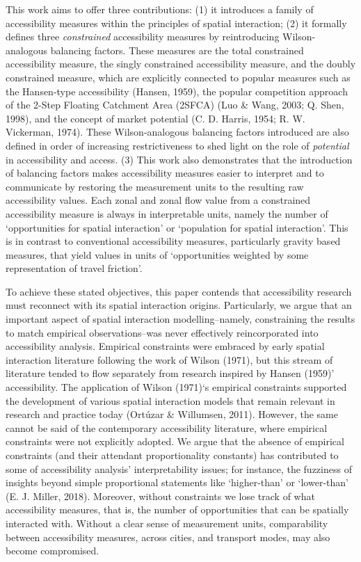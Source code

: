 \documentclass[
11pt, %
oneside, %
english, %
singlespacing, %
]{macthesis} %
\begin{document}
This work aims to offer three contributions: (1) it introduces a family of accessibility measures within the principles of spatial interaction; (2) it formally defines three \emph{constrained} accessibility measures by reintroducing Wilson-analogous balancing factors. These measures are the total constrained accessibility measure, the singly constrained accessibility measure, and the doubly constrained measure, which are explicitly connected to popular measures such as the Hansen-type accessibility (Hansen, 1959), the popular competition approach of the 2-Step Floating Catchment Area (2SFCA) (Luo \& Wang, 2003; Q. Shen, 1998), and the concept of market potential (C. D. Harris, 1954; R. W. Vickerman, 1974). These Wilson-analogous balancing factors introduced are also defined in order of increasing restrictiveness to shed light on the role of \emph{potential} in accessibility and access. (3) This work also demonstrates that the introduction of balancing factors makes accessibility measures easier to interpret and to communicate by restoring the measurement units to the resulting raw accessibility values. Each zonal and zonal flow value from a constrained accessibility measure is always in interpretable units, namely the number of `opportunities for spatial interaction' or `population for spatial interaction'. This is in contrast to conventional accessibility measures, particularly gravity based measures, that yield values in units of `opportunities weighted by some representation of travel friction'.

To achieve these stated objectives, this paper contends that accessibility research must reconnect with its spatial interaction origins. Particularly, we argue that an important aspect of spatial interaction modelling--namely, constraining the results to match empirical observations--was never effectively reincorporated into accessibility analysis. Empirical constraints were embraced by early spatial interaction literature following the work of Wilson (1971), but this stream of literature tended to flow separately from research inspired by Hansen (1959)' accessibility. The application of Wilson (1971)`s empirical constraints supported the development of various spatial interaction models that remain relevant in research and practice today (Ortúzar \& Willumsen, 2011). However, the same cannot be said of the contemporary accessibility literature, where empirical constraints were not explicitly adopted. We argue that the absence of empirical constraints (and their attendant proportionality constants) has contributed to some of accessibility analysis' interpretability issues; for instance, the fuzziness of insights beyond simple proportional statements like `higher-than' or `lower-than' (E. J. Miller, 2018). Moreover, without constraints we lose track of what accessibility measures, that is, the number of opportunities that can be spatially interacted with. Without a clear sense of measurement units, comparability between accessibility measures, across cities, and transport modes, may also become compromised.
\end{document}
